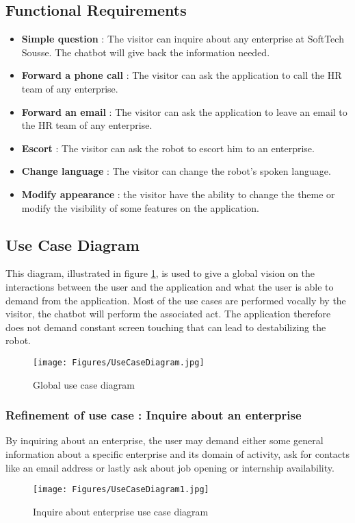 \subsection{Functional Requirements}
\begin{itemize}
    \item \textbf{Simple question} : The visitor can inquire about any enterprise at SoftTech Sousse. The chatbot will give back the information needed.
    \item \textbf{Forward a phone call} : The visitor can ask the application to call the HR team of any enterprise.
    \item \textbf{Forward an email} : The visitor can ask the application to leave an email to the HR team of any enterprise.
    \item \textbf{Escort} : The visitor can ask the robot to escort him to an enterprise.
    \item \textbf{Change language} : The visitor can change the robot's spoken language.
    \item \textbf{Modify appearance} : the visitor have the ability to change the theme or modify the visibility of some features on the application.
\end{itemize}
\subsection{Use Case Diagram}
This diagram, illustrated in figure \ref{fig:general use case}, is used to give a global vision on the interactions between the user and the application and what the user is able to demand from the application. Most of the use cases are performed vocally by the visitor, the chatbot will perform the associated act. The application therefore does not demand constant screen touching that can lead to destabilizing the robot.  
\begin{figure}[H]
\centering
\texttt{[image: Figures/UseCaseDiagram.jpg]}
\caption{Global use case diagram}
\label{fig:general use case}
\end{figure}
\subsubsection{Refinement of use case : Inquire about an enterprise}
By inquiring about an enterprise, the user may demand either some general information about a specific enterprise and its domain of activity, ask for contacts like an email address or lastly ask about job opening or internship availability.    
\begin{figure}[H]
\centering
\texttt{[image: Figures/UseCaseDiagram1.jpg]}
\caption{Inquire about enterprise use case diagram}
\label{fig:use case inquire}
\end{figure}
